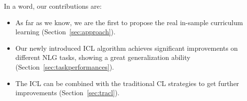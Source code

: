 %
In a word, our contributions are:
\begin{itemize}
	\item As far as we know, we are the first to propose the real 
in-sample curriculum learning (Section~\ref{sec:approach}).
	\item Our newly introduced ICL algorithm achieves significant improvements on different NLG tasks, showing a great generalization ability (Section~\ref{sec:taskperformances}).
	\item The ICL can be combined with the traditional CL strategies to get further improvements (Section~\ref{sec:tracl}). 
\end{itemize}

